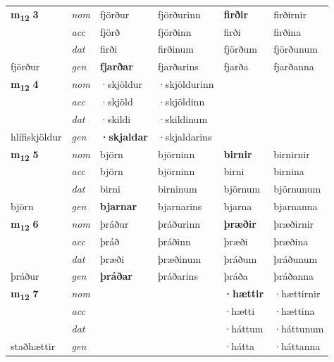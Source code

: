\begin{longtable}[l]{X>{\footnotesize\itshape}XXXXX}
\multirow{3}{*}{{{\textbf{m{\textsubscript{12}}} \Large{\textbf{3}}}}}  
 & nom & fjörður & fjörðurinn    & \textbf{firðir} & firðirnir  \\*
 & acc & fjörð  & fjörðinn   & firði  & firðina \\*
 & dat & firði & firðinum   & fjörðum & fjörðunum \\*
 {\footnotesize{fjörður}} &  gen & \textbf{fjarðar}  & fjarðarins  & fjarða & fjarðanna \\
\cmidrule{1-6}


\multirow{3}{*}{{{\textbf{m{\textsubscript{12}}} \Large{\textbf{4}}}}}  
 & nom & ·skjöldur & ·skjöldurinn    & \textbf{} &   \\*
 & acc & ·skjöld  & ·skjöldinn   &   &  \\*
 & dat & ·skildi & ·skildinum   &  &  \\*
 {\footnotesize{hlífiskjöldur}} &  gen & \textbf{·skjaldar}  & ·skjaldarins  &  &  \\
\cmidrule{1-6}


\multirow{3}{*}{{{\textbf{m{\textsubscript{12}}} \Large{\textbf{5}}}}}  
 & nom & björn & björninn    & \textbf{birnir} & birnirnir  \\*
 & acc & björn  & björninn   & birni  & birnina \\*
 & dat & birni & birninum   & björnum & björnunum \\*
 {\footnotesize{björn}} &  gen & \textbf{bjarnar}  & bjarnarins  & bjarna & bjarnanna \\
\cmidrule{1-6}


\multirow{3}{*}{{{\textbf{m{\textsubscript{12}}} \Large{\textbf{6}}}}}  
 & nom & þráður & þráðurinn    & \textbf{þræðir} & þræðirnir  \\*
 & acc & þráð  & þráðinn   & þræði  & þræðina \\*
 & dat & þræði & þræðinum   & þráðum & þráðunum \\*
 {\footnotesize{þráður}} &  gen & \textbf{þráðar}  & þráðarins  & þráða & þráðanna \\
\cmidrule{1-6}


\multirow{3}{*}{{{\textbf{m{\textsubscript{12}}} \Large{\textbf{7}}}}}  
 & nom &  &     & \textbf{·hættir} & ·hættirnir  \\*
 & acc &   &    & ·hætti  & ·hættina \\*
 & dat &  &    & ·háttum & ·háttunum \\*
 {\footnotesize{staðhættir}} &  gen & \textbf{}  &   & ·hátta & ·háttanna \\
\cmidrule{1-6}



\end{longtable}
